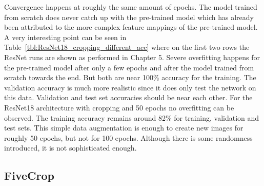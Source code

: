 Convergence happens at roughly the same amount of epochs. The model trained from scratch does never catch up with the pre-trained model which has already been attributed to the more complex feature mappings of the pre-trained model. A very interesting point can be seen in Table~\ref{tbl:ResNet18_cropping_different_acc} where on the first two rows the ResNet runs are shown as performed in Chapter 5. Severe overfitting happens for the pre-trained model after only a few epochs and after the model trained from scratch towards the end. But both are near 100\% accuracy for the training. The validation accuracy is much more realistic since it does only test the network on this data. Validation and test set accuracies should be near each other. For the ResNet18 architecture with cropping and 50 epochs no overfitting can be observed. The training accuracy remains around 82\% for training, validation and test sets. This simple data augmentation is enough to create new images for roughly 50 epochs, but not for 100 epochs. Although there is some randomness introduced, it is not sophisticated enough.

\begin{table}[!h] \centering
{}
\caption{Different set accuracies. If the training accuracy is much higher than the validation or test accuracy, then there is a problem with overfitting to the training data.}
\label{tbl:ResNet18_cropping_different_acc}
\end{table}

\subsection{FiveCrop}

